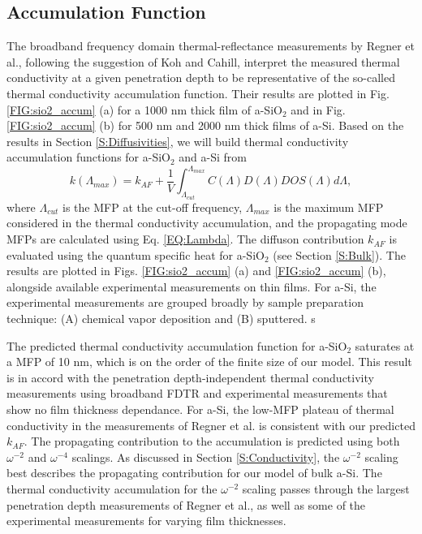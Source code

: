 \documentclass[aps,prb,onecolumn,preprint,superscriptaddress,footinbib,amsmath,amssymb,floatfix]{revtex4}
\begin{document}
\subsection{\label{S:Accumulation}Accumulation Function}

The broadband frequency domain thermal-reflectance 
measurements by Regner et al.,\cite{regner_broadband_2013}  
following the suggestion of Koh and Cahill,\cite{koh_frequency_2007} 
interpret the  
measured thermal conductivity at a given penetration depth 
to be representative of the so-called thermal conductivity 
accumulation function.\cite{dames_thermal_2005,yang_mean_2013} 
Their results are plotted in Fig. \ref{FIG:sio2_accum} (a) 
for a 1000 nm thick film of a-SiO$_2$ 
and in Fig. \ref{FIG:sio2_accum} (b) for 500 nm and 
2000 nm thick films of a-Si. 
Based on the results in Section \ref{S:Diffusivities}, we will build 
thermal conductivity accumulation functions for a-SiO$_2$ and a-Si from
\begin{equation}\label{EQ:kLambda}
k(\Lambda_{max}) = k_{AF} + 
\frac{1}{V}\int^{\Lambda_{max}}_{\Lambda_{cut}} 
C(\Lambda) D(\Lambda)DOS(\Lambda)d\Lambda,
\end{equation}
where $\Lambda_{cut}$ is the MFP at the cut-off frequency, 
$\Lambda_{max}$ is the maximum MFP considered in the thermal 
conductivity accumulation, and the propagating mode MFPs are 
calculated using Eq. \eqref{EQ:Lambda}. The 
diffuson contribution $k_{AF}$ is evaluated using the quantum 
specific heat for a-SiO$_2$ (see Section \ref{S:Bulk}). 
The results are plotted 
in Figs. \ref{FIG:sio2_accum} (a) and \ref{FIG:sio2_accum} (b), 
alongside available experimental measurements on thin films. 
For a-Si, the experimental measurements are grouped 
broadly by sample preparation technique: 
(A) chemical vapor deposition
\cite{moon_thermal_2002,liu_high_2009,yang_anomalously_2010}
and 
(B) sputtered.
\cite{kuo_thermal_1992,cahill_thermal_1994,wada_thermal_1996} s

The predicted thermal conductivity accumulation function for a-SiO$_2$ 
saturates 
at a MFP of 10 nm, which is on the order of the finite size 
of our model.  
This result is in accord 
with the penetration depth-independent thermal 
conductivity measurements using broadband FDTR
\cite{regner_broadband_2013} and experimental measurements 
that show no film thickness dependance.
\cite{lee_heat_1997,yamane_measurement_2002} 
For a-Si, the low-MFP plateau of thermal conductivity in the   
measurements of Regner et al. is consistent with our 
predicted $k_{AF}$. 
The propagating contribution to the accumulation is predicted 
using both $\omega^{-2}$ and $\omega^{-4}$ scalings.  
As discussed in Section \ref{S:Conductivity}, 
the $\omega^{-2}$ scaling best describes the propagating 
contribution for our model of bulk a-Si. 
The thermal conductivity accumulation for the $\omega^{-2}$ 
scaling 
passes through the largest penetration 
depth measurements of Regner et al., as well as some of the  
experimental measurements for varying film thicknesses. 
\end{document}
